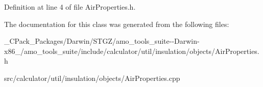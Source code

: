Definition at line 4 of file Air\+Properties.\+h.



The documentation for this class was generated from the following files\+:\begin{DoxyCompactItemize}
\item 
\+\_\+\+C\+Pack\+\_\+\+Packages/\+Darwin/\+S\+T\+G\+Z/amo\+\_\+tools\+\_\+suite-\/-\/\+Darwin-\/x86\+\_/amo\+\_\+tools\+\_\+suite/include/calculator/util/insulation/objects/Air\+Properties.\+h\item 
src/calculator/util/insulation/objects/Air\+Properties.\+cpp\end{DoxyCompactItemize}
